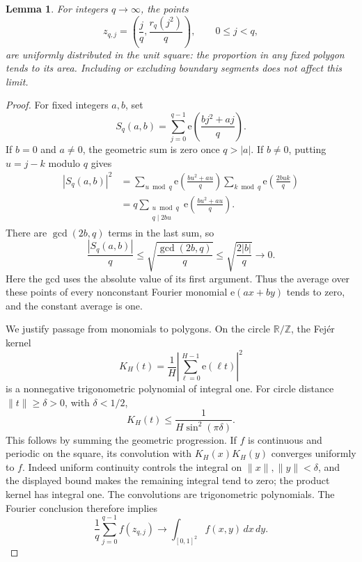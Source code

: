 \documentclass[11pt]{article}
\newtheorem{lemma}{Lemma}
\newcommand{\e}{\mathrm e}
\begin{document}
\begin{lemma}\label{distribution}
For integers \(q\to\infty\), the points
\[
 z_{q,j}=\left(\frac jq,\frac{r_q(j^2)}q\right),
 \qquad 0\le j<q,
\]
are uniformly distributed in the unit square: the proportion in any
fixed polygon tends to its area. Including or excluding boundary
segments does not affect this limit.
\end{lemma}
\begin{proof}
For fixed integers \(a,b\), set
\[
 S_q(a,b)=\sum_{j=0}^{q-1}\e\left(\frac{bj^2+aj}{q}\right).
\]
If \(b=0\) and \(a\ne0\), the geometric sum is zero once \(q>|a|\).
If \(b\ne0\), putting \(u=j-k\) modulo \(q\) gives
\begin{align*}
 |S_q(a,b)|^2
 &=\sum_{u\bmod q}\e\left(\frac{bu^2+au}{q}\right)
                    \sum_{k\bmod q}\e\left(\frac{2buk}{q}\right)\\
 &=q\sum_{\substack{u\bmod q\\q\mid2bu}}
                 \e\left(\frac{bu^2+au}{q}\right).
\end{align*}
There are \(\gcd(2b,q)\) terms in the last sum, so
\begin{equation}\label{gauss}
 \frac{|S_q(a,b)|}{q}
 \le\sqrt{\frac{\gcd(2b,q)}q}
 \le\sqrt{\frac{2|b|}{q}}\longrightarrow0.
\end{equation}
Here the gcd uses the absolute value of its first argument.
Thus the average over these points of every nonconstant Fourier
monomial \(\e(ax+by)\) tends to zero, and the constant average is one.

We justify passage from monomials to polygons.
On the circle \(\mathbb R/\mathbb Z\), the Fej\'er kernel
\[
 K_H(t)=\frac1H\left|\sum_{\ell=0}^{H-1}\e(\ell t)\right|^2
\]
is a nonnegative trigonometric polynomial of integral one.
For circle distance \(\|t\|\ge\delta>0\), with \(\delta<1/2\),
\[
 K_H(t)\le\frac1{H\sin^2(\pi\delta)}.
\]
This follows by summing the geometric progression.
If \(f\) is continuous and periodic on the square, its convolution
with \(K_H(x)K_H(y)\) converges uniformly to \(f\).
Indeed uniform continuity controls the integral on
\(\|x\|,\|y\|<\delta\), and the displayed bound makes the remaining
integral tend to zero; the product kernel has integral one.
The convolutions are trigonometric polynomials. The Fourier conclusion
therefore implies
\begin{equation}\label{continuous}
 \frac1q\sum_{j=0}^{q-1}f(z_{q,j})
 \longrightarrow\int_{[0,1]^2}f(x,y)\,dx\,dy.
\end{equation}


\end{proof}
\end{document}
